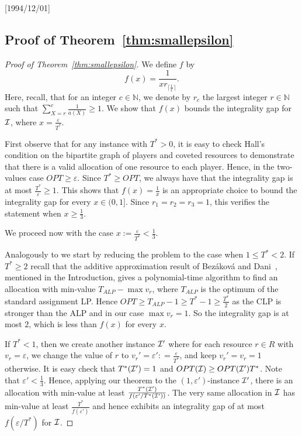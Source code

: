 \NeedsTeXFormat{LaTeX2e}[1994/12/01]\documentclass[letterpaper, 11pt]{article}
\theoremstyle{definition}
\theoremstyle{remark}
\numberwithin{equation}{section}
\begin{document}
\subsection{Proof of Theorem~\ref{thm:smallepsilon}} \label{sec:smallepsilon} \begin{proof}[Proof of Theorem~\ref{thm:smallepsilon}]

We define $f$ by
$$f(x)= \frac{1}{xr_{\lceil\frac1x\rceil}}.$$
Here, recall,
that for an integer $c\in \mathbb{N}$, we denote by
$r_c$ the  largest integer $r \in \mathbb{N}$ such that
$\sum_{X=r}^c \frac{1}{a(X)} \geq 1$. 
We show that $f(x)$ bounds the integrality gap for ${\cal I}$, where
$x=\frac{\varepsilon}{T^*}$.

First observe that for any instance with $T^* >0$, it is easy to
check Hall's condition on the bipartite graph of players and coveted
resources to demonstrate that there is a valid allocation of one
resource to each player. Hence, in the two-values case
$OPT \geq \varepsilon$.
Since $T^* \geq OPT$, we always have that the integrality gap is at
most $\frac{T^*}{\varepsilon} \geq 1$. This shows that $f(x) = \frac{1}{x}$
is an appropriate choice to bound the integrality gap for every $x\in (0,1]$.
Since $r_1=r_2=r_3 =1$, this verifies the statement when
$x\geq\frac{1}{3}$.


We proceed now with the case $x := \frac{\varepsilon}{T^*} < \frac13$. 

Analogously to \cite{chantangwu}
we start by reducing the problem to the case when
  $1\leq T^* < 2$. 
If $T^*\geq 2$ recall that
the additive approximation result of Bez\'akov\'a and
Dani~\cite{bezakovadani}, mentioned in the Introduction,
gives a polynomial-time algorithm to find an allocation with min-value
$T_{ALP}- \max v_r$, where $T_{ALP}$ is the optimum of the standard
assignment LP. Hence $OPT\geq T_{ALP}-1 \geq T^*-1 \geq
\frac{T^*}{2}$ as the CLP is stronger than
the ALP and in our case $\max v_r =1$. So the integrality gap is
at most $2$, which is less than $f(x)$ for every $x$.

If $T^* < 1$, then we create another instance ${\cal I}'$  where for each
resource $r\in R$ with $v_r=\varepsilon$, we change the value of $r$ to
$v_r'=\varepsilon' : = \frac{\varepsilon}{T^*}$,
and keep $v_r'=v_r=1$ otherwise. It is easy check that $T^*({\cal I}')
=1$ and $OPT({\cal I}) \geq OPT({\cal I}')T^*$. Note that
$\varepsilon' < \frac{1}{3}$.
Hence, applying our theorem to
the $(1, \varepsilon')$-instance ${\cal I}'$, there is
an allocation with min-value at least
$\frac{T^*({\cal I}')}{f(\varepsilon'/T^*({\cal I}'))}$.
The very same  allocation in ${\cal I}$ has min-value at least
$\frac{T^*}{f(\varepsilon')}$ and hence exhibits an
integrality gap of at most
$f(\varepsilon/T^*)$ for  ${\cal I}$.



\end{proof}
\end{document}
